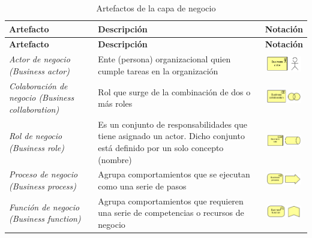  \begin{center}
 
  \begin{longtable}{|p{4cm}|p{6cm}|c|}
	\caption{Artefactos de la capa de negocio \label{tab:artefactos_capa_negocio}} \\
	\hline
    \textbf{Artefacto} & 
    \textbf{Descripción} & 
    \textbf{Notación} \\ 
    \hline
	\endfirsthead
    \hline
    \textbf{Artefacto} & 
    \textbf{Descripción} & 
    \textbf{Notación} \\ 
    \hline
	\endhead
    \hline
	\endfoot
	\hline
	\endlastfoot
    \hline
    \textit{Actor de negocio (Business actor)} & 
    Ente (persona) organizacional quien cumple tareas en la organización &  
    \includegraphics[width=1.5cm]{./imagenes/Archimate/artefactos/businessactor.png}\\
	\hline
	\textit{Colaboración de negocio (Business collaboration)} & 
    Rol que surge de la combinación de dos o más roles &  
    \includegraphics[width=1.5cm]{./imagenes/Archimate/artefactos/businesscollaboration.png}\\
	\hline    
    \textit{Rol de negocio (Business role)} & 
    Es un conjunto de responsabilidades que tiene asignado un actor. Dicho conjunto está definido por un solo concepto (nombre) &  
    \includegraphics[width=1.5cm]{./imagenes/Archimate/artefactos/businessrole.png}\\
    \hline
    \textit{Proceso de negocio (Business process)} & 
    Agrupa comportamientos que se ejecutan como una serie de pasos &  
    \includegraphics[width=1.5cm]{./imagenes/Archimate/artefactos/businessprocess.png}\\
	\hline
	\textit{Función de negocio (Business function)} & 
    Agrupa comportamientos que requieren una serie de competencias o recursos de negocio &  
    \includegraphics[width=1.5cm]{./imagenes/Archimate/artefactos/businessfunction.png}\\

\end{longtable}
\end{center}
